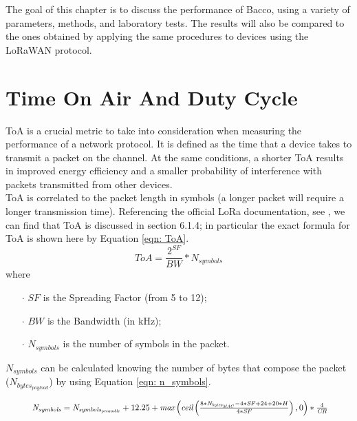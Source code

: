 The goal of this chapter is to discuss the performance of Bacco, using a variety of parameters, methods, and laboratory
tests. The results will also be compared to the ones obtained by applying the same procedures to devices using the
LoRaWAN protocol.

\section{Time On Air And Duty Cycle}
\Gls{ToA} is a crucial metric to take into consideration when measuring the performance of a network protocol. It is
defined as the time that a device takes to transmit a packet on the channel. At the same conditions, a shorter \gls{ToA}
results in improved energy efficiency and a smaller probability of interference with packets transmitted from other
devices.\\
\Gls{ToA} is correlated to the packet length in symbols (a longer packet will require a longer transmission time).
Referencing the official LoRa documentation, see \cite{sx1262}, we can find that \gls{ToA} is
discussed in section 6.1.4; in particular the exact formula for \gls{ToA} is shown here by Equation \ref{eqn: ToA}.
\begin{equation}
    \label{eqn: ToA}
    \mathit{ToA} = \frac{2^{\mathit{SF}}}{\mathit{BW}}*\mathit{N_{symbols}}
\end{equation}
where
\begin{itemize}[noitemsep,nolistsep]
    \item[\boldmath$\cdot$] $\mathit{SF}$ is the Spreading Factor (from 5 to 12);
    \item[\boldmath$\cdot$] $\mathit{BW}$ is the Bandwidth (in kHz);
    \item[\boldmath$\cdot$] $\mathit{N_{symbols}}$ is the number of symbols in the packet.
\end{itemize}
\vspace{0.55cm}
$\mathit{N_{symbols}}$ can be calculated knowing the number of bytes that compose the packet ($\mathit{N_{bytes_{payload}}}
$) by using Equation \ref{eqn: n_symbols}.

\begin{equation}
    \label{eqn: n_symbols}
    \resizebox{.9\hsize}{!}{
        \ensuremath{
            \mathit{N_{symbols}} = \mathit{N_{symbols_{preamble}}} + 12.25 + \textit{max} \left( \textit{ceil} \left(
                    \frac{8 * \mathit{N_{bytes_{MAC}}} - 4 * \mathit{SF} + 24 + 20 * H}{4 * \mathit{SF}} \right), 0 \right) * \frac{4}{\mathit{CR}}}}
\end{equation}

